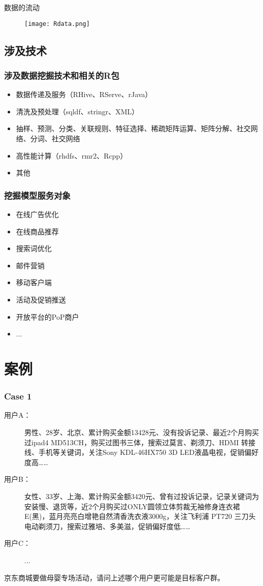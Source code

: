 \documentclass[UTF8,                %
               table,               %
               9pt,                %
               aspectratio=43]      %
               {beamer}
\begin{document}
\begin{frame}{数据的流动}
\begin{figure}
\centering
  \texttt{[image: Rdata.png]}
\end{figure}
\end{frame}


    \subsection{涉及技术}
\begin{frame}
  \frametitle{涉及数据挖掘技术和相关的R包}
    \begin{itemize}
      \item 数据传递及服务（RHive、RServe、rJava）
      \item 清洗及预处理（sqldf、stringr、XML）
      \item 抽样、预测、分类、关联规则、特征选择、稀疏矩阵运算、矩阵分解、社交网络、分词、社交网络
      \item 高性能计算（rhdfs、rmr2、Rcpp）
      \item 其他
    \end{itemize}
\end{frame}



\begin{frame}
  \frametitle{挖掘模型服务对象}
  \begin{itemize}
    \item 在线广告优化
    \item 在线商品推荐
    \item 搜索词优化
    \item 邮件营销
    \item 移动客户端
    \item 活动及促销推送
    \item 开放平台的PoP商户
    \item ...
  \end{itemize}
\end{frame}

\section{案例}

\begin{frame}
  \frametitle{Case 1}
\begin{description}
  \item[用户A：] 男性、28岁、北京、累计购买金额13428元、没有投诉记录、最近2个月购买过ipad4 MD513CH，购买过图书三体，搜索过莫言、剃须刀、HDMI 转接线、手机等关键词，关注Sony KDL-46HX750 3D LED液晶电视，促销偏好度高……
  \item[用户B：] 女性、33岁、上海、累计购买金额3420元、曾有过投诉记录，记录关键词为安装慢、退货等，近2个月购买过ONLY圆领立体剪裁无袖修身连衣裙E(黑)，蓝月亮亮白增艳自然清香洗衣液3000g，关注飞利浦 PT720 三刀头电动剃须刀，搜索过雅培、多美滋，促销偏好度低……
  \item[用户C：] ...
\end{description}

\pause
\alert{京东商城要做母婴专场活动，请问上述哪个用户更可能是目标客户群。}
\end{frame}
\end{document}
